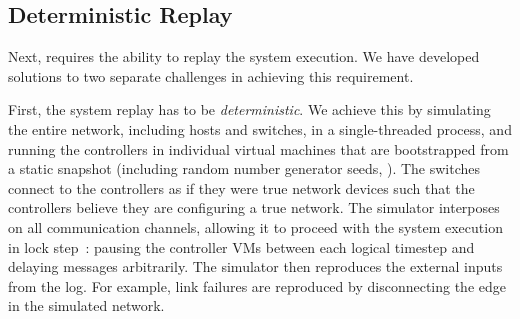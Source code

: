 %
%




\subsection{Deterministic Replay}

Next, \simulator{} requires the ability to replay the system execution.
We have developed solutions to two separate challenges in achieving this requirement.

First, the system replay has to be {\em deterministic}.
We achieve this by simulating the entire network, including hosts and
switches, in a single-threaded process, and running the controllers in
individual virtual machines that are
bootstrapped from a static snapshot (including random number generator
seeds, \etc{}). The switches connect to the controllers as if they were true
network devices such that the controllers believe they are configuring a true
network. The simulator interposes on all communication channels,
allowing it to proceed with the system execution in
lock step~\cite{Gupta06toinfinity}:
pausing the controller VMs between each logical timestep and delaying messages
arbitrarily. The simulator then reproduces the external inputs from the log.
For example, link failures are reproduced by disconnecting the edge in
the simulated network.

